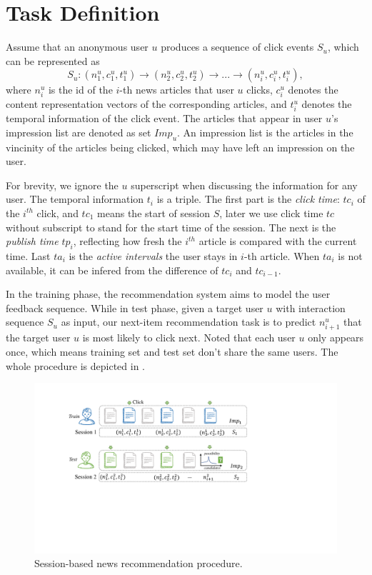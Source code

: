 \section{Task Definition}
\label{sec:task}

Assume that an anonymous user $u$ produces a sequence of click events $S_u$, 
which can be represented as \[S_u: (n_1^u,c_1^u,t_1^u)\rightarrow(n_2^u,c_2^u,t_2^u)\rightarrow...\rightarrow(n_i^u,c_i^u,t_i^u),\] 
where $n_i^u$ is the id of the $i$-th news articles that user $u$ clicks, 
$c_i^u$ denotes the content representation vectors of the corresponding articles, and $t_i^u$ denotes the temporal information of the click event. The articles that appear in user $u$'s impression list are denoted as set $Imp_u$. An impression list is the articles in the vincinity of the articles
being clicked, which may have left an impression on the user.

For brevity, we ignore the $u$ superscript when discussing the information
for any user. The temporal information $t_i$ is a triple. 
The first part is the \textit{click time}: $tc_i$ of the $i^{th}$ click, and $tc_1$ means the start of session $S$, later we use click time $tc$ without subscript to stand for the start time of the session. The next is the 
\textit{publish time} $tp_i$, reflecting how fresh the $i^{th}$ article is compared with the current time. Last $ta_i$ is the \textit{active intervals} the user stays in $i$-th article. When $ta_i$ is not available, it can be infered from the difference of $tc_i$ and $tc_{i-1}$.

In the training phase, the recommendation system aims to model the 
user feedback sequence. While in test phase, 
given a target user $u$ with interaction sequence $S_u$ as input, 
our next-item recommendation task is 
to predict $n_{i+1}^u$ that the target user $u$ is most likely to click next. 
Noted that each user $u$ only appears once, 
which means training set and test set don't share the same users. 
The whole procedure is depicted in .

\begin{figure}[th]
    \centering
    \includegraphics[width=\columnwidth]{fig/task.pdf}
    \caption{Session-based news recommendation procedure.}
    \label{fig:task}
\end{figure}
